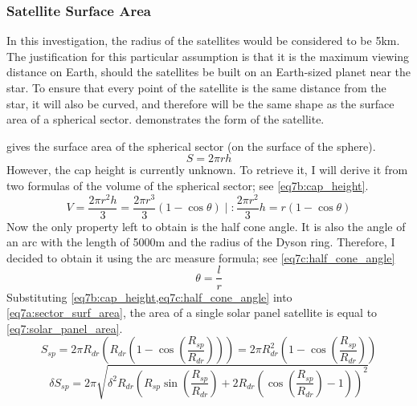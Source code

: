 \documentclass[stu, 11pt, a4paper, floatsintext]{apa7}
\begin{document}
	\subsubsection{Satellite Surface Area}
	In this investigation, the radius of the satellites would be considered to be 5km. The justification for this particular assumption is that it is the maximum viewing distance on Earth, should the satellites be built on an Earth-sized planet near the star. To ensure that every point of the satellite is the same distance from the star, it will also be curved, and therefore will be the same shape as the surface area of a spherical sector.  demonstrates the form of the satellite.
	
	 gives the surface area of the spherical sector (on the surface of the sphere).
	\begin{equation}
		\label{eq7a:sector_surf_area}
		\tag{7.a}
		 S=2\pi rh
	\end{equation}
	However, the cap height is currently unknown. To retrieve it, I will derive it from two formulas of the volume of the spherical sector; see \cref{eq7b:cap_height}.
	\begin{equation}
		\label{eq7b:cap_height}
		\tag{7.b}
		V=\frac{2\pi r^2h}{3}=\frac{2\pi r^3}{3}\left(1-\cos\theta\right)\;|\;:\frac{2\pi r^2}{3}
		h = r\left(1-\cos\theta\right)
	\end{equation}
	Now the only property left to obtain is the half cone angle. It is also the angle of an arc with the length of 5000m and the radius of the Dyson ring. Therefore, I decided to obtain it using the arc measure formula; see \cref{eq7c:half_cone_angle}
	\begin{equation}
		\label{eq7c:half_cone_angle}
		\tag{7.c}
		\theta = \frac{l}{r}
	\end{equation}
	Substituting \cref{eq7b:cap_height,eq7c:half_cone_angle} into \cref{eq7a:sector_surf_area}, the area of a single solar panel satellite is equal to \cref{eq7:solar_panel_area}.
	\begin{equation}
		\label{eq7:solar_panel_area}
		S_{sp}=2\pi R_{dr} \left(R_{dr}\left(1-\cos\left(\frac{R_{sp}}{R_{dr}}\right)\right)\right)=2\pi R_{dr}^2\left(1-\cos\left(\frac{R_{sp}}{R_{dr}}\right)\right)
	\end{equation}
	\begin{equation*}
		\delta S_{sp}=2\pi\sqrt{\delta^2R_{dr}\left(R_{sp}\sin\left(\frac{R_{sp}}{R_{dr}}\right)+2R_{dr}\left(\cos\left(\frac{R_{sp}}{R_{dr}}\right)-1\right)\right)^2}
	\end{equation*}
\end{document}
